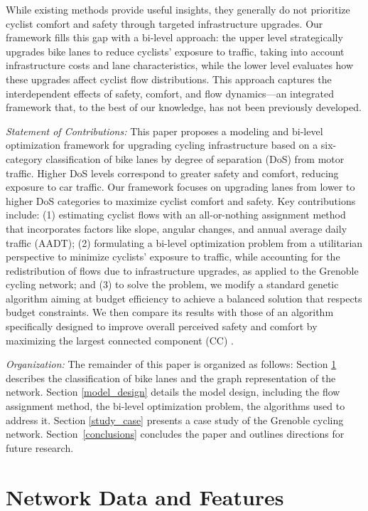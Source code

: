 \documentclass[letterpaper, 10 pt, conference]{ieeeconf}  %
\begin{document}
While existing methods provide useful insights, they generally do not prioritize cyclist comfort and safety through targeted infrastructure upgrades. Our framework fills this gap with a bi-level approach: the upper level strategically upgrades bike lanes to reduce cyclists' exposure to traffic, taking into account infrastructure costs and lane characteristics, while the lower level evaluates how these upgrades affect cyclist flow distributions. This approach captures the interdependent effects of safety, comfort, and flow dynamics—an integrated framework that, to the best of our knowledge, has not been previously developed.

\textit{Statement of Contributions:} This paper proposes a modeling and  bi-level optimization framework for upgrading cycling infrastructure based on a six-category classification of bike lanes by degree of separation (DoS) from motor traffic. Higher DoS levels correspond to greater safety and comfort, reducing exposure to car traffic. Our framework focuses on upgrading lanes from lower to higher DoS categories to maximize cyclist comfort and safety. Key contributions include: (1) estimating cyclist flows with an all-or-nothing assignment method that incorporates factors like slope, angular changes, and annual average daily traffic (AADT); (2) formulating a bi-level optimization problem from a utilitarian perspective to minimize cyclists' exposure to traffic, while accounting for the redistribution of flows due to infrastructure upgrades, as applied to the Grenoble cycling network; and (3) to solve the problem, we modify a standard genetic algorithm aiming at budget efficiency to achieve a balanced solution that respects budget constraints. We then compare its results with those of an algorithm specifically designed to improve overall perceived safety and comfort by maximizing the largest connected component (CC) \cite{2024graphbased}.

\textit{Organization:} The remainder of this paper is organized as follows: Section \ref{osm_data} describes the classification of bike lanes and the graph representation of the network. Section \ref{model_design} details the model design, including the flow assignment method, the bi-level optimization problem, the algorithms used to address it. Section \ref{study_case} presents a case study of the Grenoble cycling network. Section~\ref{conclusions} concludes the paper and outlines directions for future research.


\section{Network Data and Features}
\label{osm_data}
\end{document}
